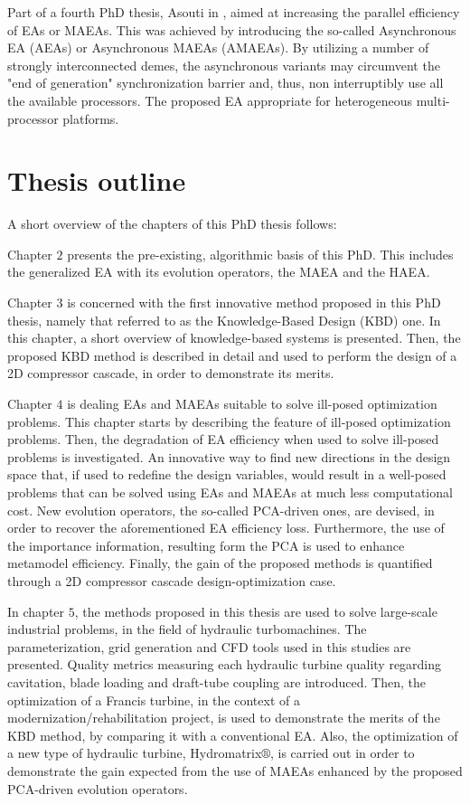 Part of a fourth PhD thesis, Asouti in \cite{phd_Vera}, aimed at increasing the parallel efficiency of EAs or MAEAs. This was achieved by introducing the so-called Asynchronous EA (AEAs) or Asynchronous MAEAs (AMAEAs). By utilizing a number of strongly interconnected demes, the asynchronous variants may circumvent the "end of generation" synchronization barrier and, thus, non interruptibly use all the available processors.     The proposed EA appropriate for heterogeneous multi-processor platforms. 

\section{Thesis outline} %
A short overview of the chapters of this PhD thesis follows:

Chapter $2$ presents the pre-existing, algorithmic basis of this PhD. This includes the generalized EA with its evolution operators, the MAEA and the HAEA.

Chapter $3$ is concerned with the first innovative method proposed in this PhD thesis, namely that referred to as the Knowledge-Based Design (KBD) one. In this chapter, a short overview of knowledge-based systems is presented. Then, the proposed KBD method is described in detail and used to perform the design of a 2D compressor cascade, in order to demonstrate its merits.

Chapter $4$ is dealing EAs and MAEAs suitable to solve ill-posed optimization problems. This chapter starts by describing the feature of ill-posed optimization problems. Then, the degradation of EA efficiency when used to solve ill-posed problems is investigated. An innovative way to find new directions in the design space that, if used to redefine the design variables, would result in a well-posed problems that can be solved using EAs and MAEAs at much less computational cost.  New evolution operators, the so-called PCA-driven ones, are devised, in order to recover the aforementioned EA efficiency loss. Furthermore, the use of the importance information, resulting form the PCA is used to enhance metamodel efficiency. Finally, the gain of the proposed methods is quantified through a 2D compressor cascade design-optimization case.

In chapter $5$, the methods proposed in this thesis are used to solve large-scale industrial problems, in the field of hydraulic turbomachines. The parameterization, grid generation and CFD tools used in this studies are presented. Quality metrics measuring each hydraulic turbine quality regarding cavitation, blade loading and draft-tube coupling are introduced. Then, the optimization of a Francis turbine, in the context of a modernization/rehabilitation project, is used to demonstrate the merits of the KBD method, by comparing it with a conventional EA. Also, the optimization of a new type of hydraulic turbine, Hydromatrix$\circledR$, is carried out in order to demonstrate the gain expected from the use of MAEAs enhanced by the proposed PCA-driven evolution operators.

